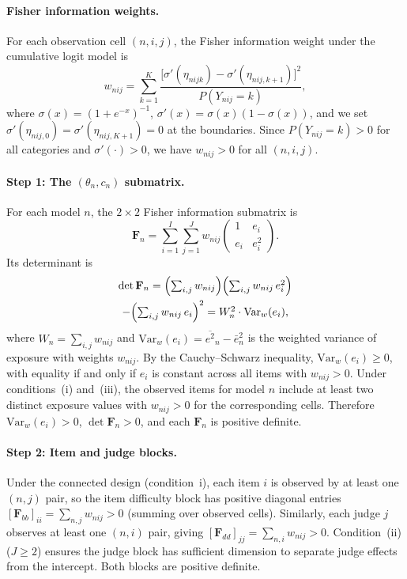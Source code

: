 \paragraph{Fisher information weights.} For each observation cell $(n,i,j)$, the Fisher information weight under the cumulative logit model is
%
\begin{equation}
\label{eq:fisher_weight}
w_{nij} = \sum_{k=1}^{K} \frac{\bigl[\sigma'(\eta_{nijk}) - \sigma'(\eta_{nij,k+1})\bigr]^2}{P(Y_{nij} = k)},
\end{equation}
%
where $\sigma(x) = (1 + e^{-x})^{-1}$, $\sigma'(x) = \sigma(x)(1 - \sigma(x))$, and we set $\sigma'(\eta_{nij,0}) = \sigma'(\eta_{nij,K+1}) = 0$ at the boundaries. Since $P(Y_{nij} = k) > 0$ for all categories and $\sigma'(\cdot) > 0$, we have $w_{nij} > 0$ for all $(n,i,j)$.

\paragraph{Step 1: The $(\theta_n, c_n)$ submatrix.} For each model $n$, the $2 \times 2$ Fisher information submatrix is
%
\begin{equation}
\label{eq:fisher_block}
\mathbf{F}_n = \sum_{i=1}^{I} \sum_{j=1}^{J} w_{nij}
\begin{pmatrix} 1 & e_i \\ e_i & e_i^2 \end{pmatrix}.
\end{equation}
%
Its determinant is
%
\begin{multline}
\det \mathbf{F}_n = \Bigl(\textstyle\sum_{i,j} w_{nij}\Bigr)\Bigl(\textstyle\sum_{i,j} w_{nij}\, e_i^2\Bigr) \\
- \Bigl(\textstyle\sum_{i,j} w_{nij}\, e_i\Bigr)^2 = W_n^2 \cdot \mathrm{Var}_w(e_i),
\end{multline}
%
where $W_n = \sum_{i,j} w_{nij}$ and $\mathrm{Var}_w(e_i) = \overline{e^2}_n - \bar{e}_n^2$ is the weighted variance of exposure with weights $w_{nij}$. By the Cauchy--Schwarz inequality, $\mathrm{Var}_w(e_i) \geq 0$, with equality if and only if $e_i$ is constant across all items with $w_{nij} > 0$. Under conditions~(i) and~(iii), the observed items for model $n$ include at least two distinct exposure values with $w_{nij} > 0$ for the corresponding cells. Therefore $\mathrm{Var}_w(e_i) > 0$, $\det \mathbf{F}_n > 0$, and each $\mathbf{F}_n$ is positive definite.

\paragraph{Step 2: Item and judge blocks.} Under the connected design (condition~i), each item $i$ is observed by at least one $(n,j)$ pair, so the item difficulty block has positive diagonal entries $[\mathbf{F}_{bb}]_{ii} = \sum_{n,j} w_{nij} > 0$ (summing over observed cells). Similarly, each judge $j$ observes at least one $(n,i)$ pair, giving $[\mathbf{F}_{dd}]_{jj} = \sum_{n,i} w_{nij} > 0$. Condition~(ii) ($J \geq 2$) ensures the judge block has sufficient dimension to separate judge effects from the intercept. Both blocks are positive definite.

